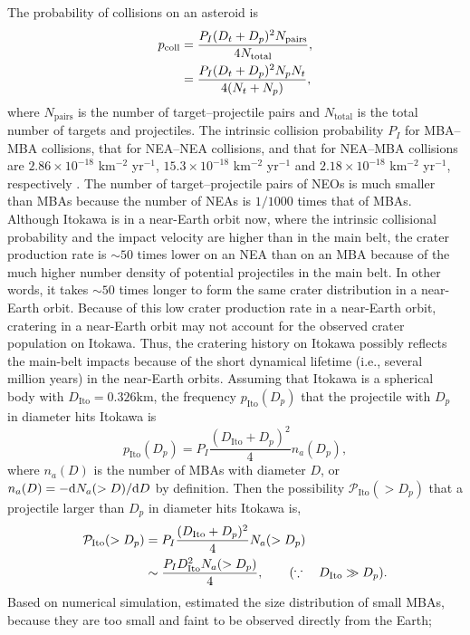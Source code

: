 \documentclass[3p,authoryear]{elsarticle}
\begin{document}
The probability of collisions on an asteroid is
\begin{align}
	p_\text{coll}&=\frac{P_I(D_t+D_p)^2N_\text{pairs}}{4 N_\text{total}}, \notag\\
	&=\frac{P_I(D_t+D_p)^2N_pN_t}{4(N_t+N_p)},
\end{align}
where $N_\text{pairs}$ is the number of target--projectile pairs and $N_\text{total}$ is the total number of targets and projectiles.
The intrinsic collision probability $P_I$ for MBA--MBA collisions, that for NEA--NEA collisions, and that for NEA--MBA collisions are $2.86\times 10^{-18}$ km$^{-2}$ yr$^{-1}$, $15.3\times 10^{-18}$ km$^{-2}$ yr$^{-1}$ and $2.18\times 10^{-18}$ km$^{-2}$ yr$^{-1}$, respectively \citep{bottke1994}.
The number of target--projectile pairs of NEOs is much smaller than MBAs because the number of NEAs is $1/1000$ times that of MBAs.
Although Itokawa is in a near-Earth orbit now, where the intrinsic collisional probability and the impact velocity are higher than in the main belt,
the crater production rate is $\sim 50$ times lower on an NEA than on an MBA because of the much higher number density of potential projectiles in the main belt.
In other words, it takes $\sim 50$ times longer to form the same crater distribution in a near-Earth orbit.
Because of this low crater production rate in a near-Earth orbit, cratering in a near-Earth orbit may not account for the observed crater population on Itokawa.
Thus, the cratering history on Itokawa possibly reflects the main-belt impacts because of the short dynamical lifetime (i.e., several million years) in the near-Earth orbits.
Assuming that Itokawa is a spherical body with $D_\text{Ito}=0.326$km, the frequency $p_\text{Ito}(D_p)$ that the projectile with $D_p$ in diameter hits Itokawa is
\begin{equation}
	p_\text{Ito}(D_p) = P_I\frac{(D_\text{Ito}+D_p)^2}{4}n_a(D_p),
\end{equation}
where $n_a(D)$ is the number of MBAs with diameter $D$, or $n_a(D)=-{\rm d} N_a(>D)/{\rm d} D$ by definition.
Then the possibility $\mathcal{P}_\text{Ito}(>D_p)$ that a projectile larger than $D_p$ in diameter hits Itokawa is,
\begin{align}
	\mathcal{P}_\text{Ito}(>D_p) &= P_I\frac{(D_\text{Ito}+D_p)^2}{4}N_a(>D_p) \notag\\
	&\sim \frac{P_I D_\text{Ito}^2N_a(>D_p)}{4},\qquad (\because\quad D_\text{Ito} \gg D_p).
\end{align}
Based on numerical simulation, \citet{obrien2005} estimated the size distribution of small MBAs, because they are too small and faint to be observed directly from the Earth;
\end{document}
